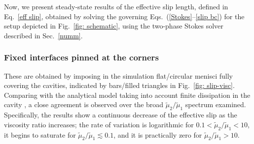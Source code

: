 
Now, we present steady-state results of the effective slip length, defined in Eq.\ \eqref{eff slip}, obtained by solving the governing Eqs.\ (\ref{Stokes}--\ref{slip bc}) for the setup depicted in Fig.\ \ref{fig: schematic}, using the two-phase Stokes solver described in Sec.\ \ref{numm}. 

\subsubsection{Fixed interfaces pinned at the corners}
  
These are obtained by imposing in the simulation flat/circular menisci fully covering the cavities, indicated by bars/filled triangles in Fig.\ \ref{fig: slip-visc}. Comparing with the analytical model taking into account finite dissipation in the cavity \cite{Schonecker}, a close agreement is observed over the broad $\tilde{\mu}_2/\tilde{\mu}_1$ spectrum examined. 
Specifically, the results show a continuous decrease of the effective slip as the viscosity ratio increases; the rate of variation is logarithmic for $0.1 < \tilde{\mu}_2/\tilde{\mu}_1 < 10$, it begins to saturate for $\tilde{\mu}_2/\tilde{\mu}_1 \lesssim 0.1$, and it is practically zero for $\tilde{\mu}_2/\tilde{\mu}_1 > 10$. 

